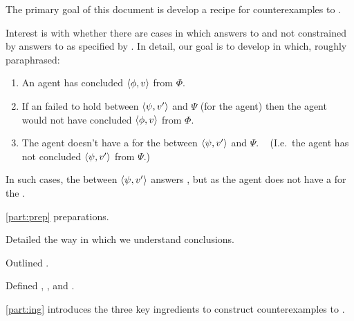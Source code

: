 \begin{note}
  The primary goal of this document is develop a recipe for counterexamples to \issueConstraint{}.

  Interest is with whether there are cases in which answers to \qWhyV{} and not constrained by answers to \qHowV{} as specified by \issueConstraint{}.
  In detail, our goal is to develop  in which, roughly paraphrased:

  \begin{enumerate}
  \item
    An agent has concluded \(\langle \phi, v \rangle\) from \(\Phi\).
  \item
    If an \ros{} failed to hold between \(\langle \psi, v' \rangle\) and \(\Psi\) (for the agent) then the agent would not have concluded \(\langle \phi, v \rangle\) from \(\Phi\).
  \item
    The agent doesn't have a \wit{} for the \ros{} between \(\langle \psi, v' \rangle\) and \(\Psi\).\newline
    \mbox{ }\hfill%
    (I.e.\ the agent has not concluded \(\langle \psi, v' \rangle\) from \(\Psi\).)
  \end{enumerate}

  In such cases, the \ros{} between \(\langle \psi, v' \rangle\) answers \qWhyV{}, but as the agent does not have a \wit{} for the \ros{}.
\end{note}

\begin{note}
  \autoref{part:prep} preparations.

  \begin{TOCEnum}
  \item

    Detailed the way in which we understand conclusions.
  \item

    Outlined .
  \item

    Defined \qWhyV{}, \qHowV{}, and \issueConstraint{}.
  \end{TOCEnum}
\end{note}

\begin{note}
  \autoref{part:ing} introduces the three key ingredients to construct counterexamples to \issueConstraint{}.

  \begin{TOCEnum}
  \item
  \item
  \item
  \end{TOCEnum}

\end{note}

